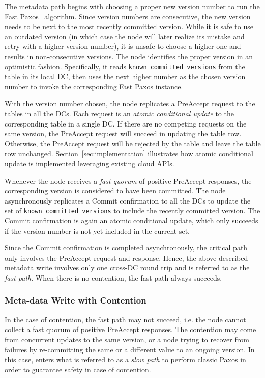 The metadata path begins with choosing a proper new version number to run the
Fast Paxos~\cite{lamport05fast} algorithm. Since version numbers are
consecutive, the new version needs to be next to the most recently committed
version. While it is safe to use an outdated version (in which case the {\name}
node will later realize its mistake and retry with a higher version number), it
is unsafe to choose a higher one and results in non-consecutive versions. The
{\name} node identifies the proper version in an optimistic fashion.
Specifically, it reads {\tt known committed versions} from the table in its
local DC, then uses the next higher number as the chosen version number to
invoke the corresponding Fast Paxos instance.

With the version number chosen, the {\name} node replicates a PreAccept request
to the tables in all the DCs.
Each request is an {\em atomic conditional update} to the corresponding table in a single DC.
If there are no competing requests on the same version, the PreAccept request will succeed in updating the table row.
Otherwise, the PreAccept request will be rejected by the table and leave the table row unchanged.
Section~\ref{sec:implementation} illustrates how atomic conditional update is implemented leveraging existing cloud APIs.

Whenever the {\name} node receives a {\em fast quorum} of positive PreAccept responses,
the corresponding version is considered to have been committed.
The {\name} node asynchronously replicates a Commit confirmation to all the DCs to update 
the set of {\tt known committed versions} to include the recently committed version.
The Commit confirmation is again an atomic conditional update,
which only succeeds if the version number is not yet included in the current set.

Since the Commit confirmation is completed asynchronously,
the critical path only involves the PreAccept request and response.
Hence, the above described metadata write involves only one cross-DC round trip 
and is referred to as the {\em fast path}.  When there is no
contention, the fast path always succeeds.

\subsubsection{Meta-data Write with Contention}

In the case of contention, the fast path may not succeed, i.e. the {\name} node
cannot collect a fast quorum of positive PreAccept responses. The contention
may come from concurrent updates to the same version, or a {\name} node trying
to recover from failures by re-committing the same or a different value to an
ongoing version.  In this case, {\name} enters what is referred to as a
\emph{slow path} to perform classic Paxos in order to guarantee safety in case of
contention.

